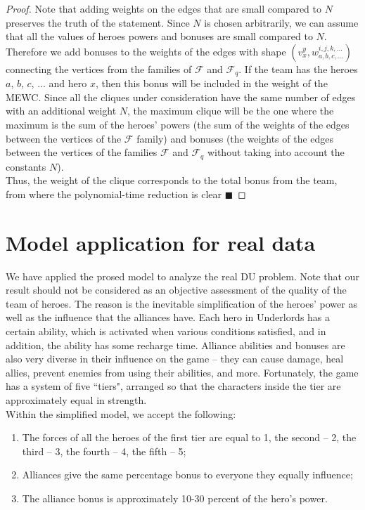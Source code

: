 \documentclass[smallextended]{svjour3}       %
\begin{document}
\begin{proof}
    Note that adding weights on the edges that are small compared to $N$ preserves the truth of the statement. Since $N$ is chosen arbitrarily, we can assume that all the values of heroes powers and bonuses are small compared to $N$.\\
	Therefore we add bonuses to the weights of the edges with shape $ (v_x^{y}, w_{a, b, c, ...} ^ {i, j, k, ...}) $ connecting the vertices from the families of $\mathcal{F} $ and $ \mathcal{F}_q $. If the team has the heroes $a$, $b$, $c$, ... and hero $x$, then this bonus will be included in the weight of the MEWC. Since all the cliques under consideration have the same number of edges with an additional weight $N$, the maximum clique will be the one where the maximum is the sum of the heroes' powers (the sum of the weights of the edges between the vertices of the $ \mathcal{F} $ family) and bonuses (the weights of the edges between the vertices of the families $ \mathcal{F} $ and $ \mathcal {F}_q $ without taking into account the constants $ N $).\\
Thus, the weight of the clique corresponds to the total bonus from the team, from where the polynomial-time reduction is clear    $\blacksquare$
\end{proof}
\section{Model application for real data}
\label{SectionComputationalResults}
We have applied the prosed model to analyze the real DU problem. Note that our result should not be considered as an objective assessment of the quality of the team of heroes. The reason is the inevitable simplification of the heroes’ power as well as the influence that the alliances have. Each hero in Underlords has a certain ability, which is activated when various conditions satisfied, and in addition, the ability has some recharge time. Alliance abilities and bonuses are also very diverse in their influence on the game -- they can cause damage, heal allies, prevent enemies from using their abilities, and more. Fortunately, the game has a system of five ``tiers", arranged so that the characters inside the tier are approximately equal in strength.\\
Within the simplified model, we accept the following:
\begin{enumerate}
\item The forces of all the heroes of the first tier are equal to 1,  the second -- 2, the third -- 3, the fourth -- 4, the fifth -- 5;
\item Alliances give the same percentage bonus to everyone they equally influence;
\item The alliance bonus is approximately 10-30 percent of the hero’s power.
\end{enumerate}
\end{document}
